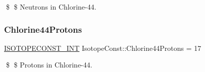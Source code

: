 \$ \$ Neutrons in Chlorine-\/44. \mbox{\label{group___isotope_const-_chlorine-_cl44_gab58a8a26c44620da55a32b6e10521a26}} 
\subsubsection{\texorpdfstring{Chlorine44\+Protons}{Chlorine44Protons}}
{\footnotesize\ttfamily \mbox{\hyperlink{group___isotope_const-_macros_ga5f18360b3e99483a35c32d789e62621c}{I\+S\+O\+T\+O\+P\+E\+C\+O\+N\+S\+T\+\_\+\+I\+NT}} Isotope\+Const\+::\+Chlorine44\+Protons = 17}

\$ \$ Protons in Chlorine-\/44. 